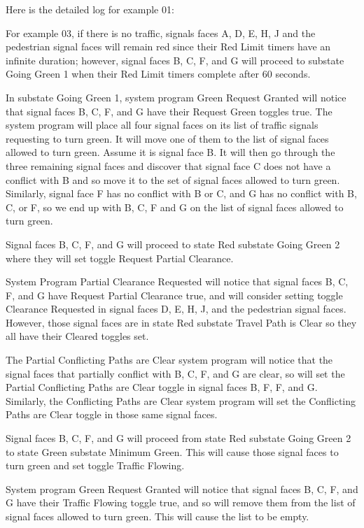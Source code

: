 \documentclass[letterpaper,twoside]{article}
\begin{document}
Here is the detailed log for example 01:



For example 03, if there is no traffic, signals faces A, D, E, H, J and the
pedestrian signal faces will remain red
since their Red Limit timers have an infinite duration; however,
signal faces B, C, F, and G will proceed to substate Going Green 1 when
their Red Limit timers complete after 60 seconds.

In substate Going Green 1, system program Green Request Granted will notice
that signal faces B, C, F, and G have their Request Green toggles true.
The system program will place all four signal faces on its list of traffic
signals requesting to turn green.  It will move one of them to the list
of signal faces allowed to turn green.  Assume it is signal face B.
It will then go through the three
remaining signal faces and discover that signal face C does not have
a conflict with B and so move it to the set of signal faces allowed
to turn green.  Similarly, signal face F has no conflict with B or C,
and G has no conflict with B, C, or F, so we end up with B, C, F and G
on the list of signal faces allowed to turn green.

Signal faces B, C, F, and G will proceed to state Red
substate Going Green 2 where they will set toggle Request Partial Clearance.

System Program Partial Clearance Requested will notice that signal faces
B, C, F, and G have Request Partial Clearance true,
and will consider setting toggle Clearance
Requested in signal faces D, E, H, J, and the pedestrian signal faces.
However, those signal faces
are in state Red substate Travel Path is Clear so they all have their
Cleared toggles set.

The Partial Conflicting Paths are Clear system program will notice that the
signal faces that partially conflict with B, C, F, and G are clear,
so will set the
Partial Conflicting Paths are Clear toggle in signal faces B, F, F, and G.
Similarly, the Conflicting Paths are Clear system program will set
the Conflicting Paths are Clear toggle in those same signal faces.

Signal faces B, C, F, and G will proceed from state Red substate
Going Green 2 to state Green substate Minimum Green.
This will cause those signal faces to turn green and set toggle
Traffic Flowing.

System program Green Request Granted will notice that signal faces
B, C, F, and G have their Traffic Flowing toggle true,
and so will remove them from the list of signal faces allowed to turn green.
This will cause the list to be empty.
\end{document}

